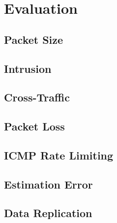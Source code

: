 \chapter{Evaluation}

\section{Packet Size}

\section{Intrusion}

\section{Cross-Traffic}

\section{Packet Loss}

\section{ICMP Rate Limiting}

\section{Estimation Error}

\section{Data Replication}
